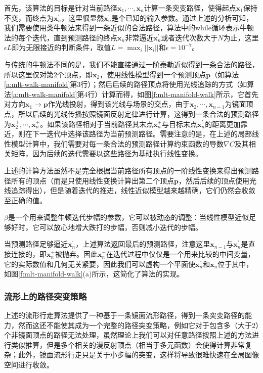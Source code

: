 首先，该算法的目标是针对当前路径$\mathbf{x}_1,\cdots,\mathbf{x}_n$计算一条突变路径，使得起点$\mathbf{x}_1$保持不变，而终点为$\mathbf{x}^{'}_n$，这里很显然$\mathbf{x}^{'}_n$是个已知的输入参数。通过上述的分析可知，我们需要使用类牛顿法来得到一条近似的合法路径，算法中的while循环表示牛顿法的每个迭代，直到预测路径的终点$\mathbf{x}_n$非常逼近$\mathbf{x}^{'}_n$或者迭代次数大于$N$为止，这里$\epsilon L$即为无限接近的判断条件，取值$L=\max_i||\mathbf{x}_i||$和$\epsilon=10^{-7}$。

与传统的牛顿法不同的是，我们不能直接通过一阶泰勒近似得到一条合法的路径，所以这里仅对第2个顶点，即$\mathbf{x}_2$，使用线性模型得到一个预测顶点$\mathbf{p}$（如算法\ref{a:mlt-walk-manifold}第3行）；然后后续的路径顶点将使用光线追踪的方式（如算法\ref{a:mlt-walk-manifold}第4行）计算而得，如图\ref{f:mlt-manifold-walk}所示，它首先对方向$\mathbf{x}_1\to\mathbf{p}$作光线投射，得到该光线与场景的交点，由于$\mathbf{x}_2,\cdots,\mathbf{x}_{n-1}$为镜面顶点，所以后续的光线传播按照镜面反射定律进行计算，这得到一条合法的预测路径为$\mathbf{x}^{+}_2,\cdots,\mathbf{x}^{+}_n$。如果该路径相对于当前路径其末点$\mathbf{x}^{+}_n$与目标末点$\mathbf{x}^{'}_n$的距离更加靠近，则在下一迭代中选择该路径为当前预测路径。需要注意的是，在上述的局部线性模型计算中，我们需要对每一条合法的预测路径计算约束函数的导数$\nabla C$及其相关矩阵，因为后续的迭代需要以这些路径为基础执行线性变换。

上述的计算方法虽然不是完全根据当前路径所有顶点的一阶线性变换来得出预测路径所有的顶点（而是只使用线性变换计算出第二个顶点$\mathbf{p}$，然后后续的顶点使用光线追踪得出），但是随着迭代的推进，线性近似模型越来越精确，它们仍然会收敛至正确的值。

$\beta$是一个用来调整牛顿迭代步幅的参数，它可以被动态的调整：当线性模型近似足够好时，它可以放心地增大跌打的步幅，否则减小迭代的步幅。

当预测路径足够逼近$\mathbf{x}^{'}_n$，上述算法返回最后的预测路径，注意这里$\mathbf{x}_{n-1}$与$\mathbf{x}^{'}_n$是直接连接的，即$\mathbf{x}^{+}_n$被抛弃。因此$\mathbf{x}^{+}_n$在迭代过程中仅仅是一个用来比较的中间变量，它的实际数值和几何无关紧要，因此我们可以虚构一个平面使$\mathbf{x}^{'}_n$和$\mathbf{x}_n$位于其中，如图\ref{f:mlt-manifold-walk}(a)所示，这简化了算法的实现。





\subsubsection{流形上的路径突变策略}\label{sec:mlt-manifold-perturbation}
上述的流形行走算法提供了一种基于一条镜面流形路径，得到一条突变路径的能力，然而这还不能使其成为一个完整的路径突变策略，例如它对于包含多（大于2）个非镜面顶点的路径无法处理，虽然理论上我们可以对任意路径按照上述的方法进行类似推算，但是多个相关的漫反射顶点（相当于多元函数）会使得计算非常复杂；此外，镜面流形行走只是关于小步幅的突变，这样将导致很难快速在全局图像空间进行收敛。

